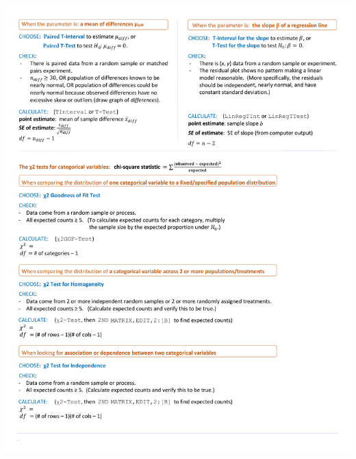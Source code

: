 \label{inferenceGuide}

\begin{center}
\includegraphics[height=9.3in]{extraTeX/inferenceGuide/figures/inference_guide2}
\end{center}
\restoregeometry
